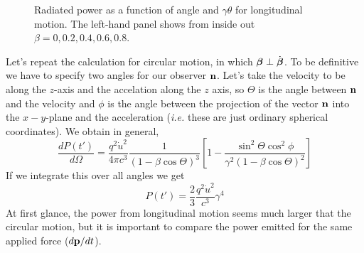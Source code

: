{
\begin{figure}
\centering
\caption{Radiated power as a function of angle and $\gamma \theta$ for
  longitudinal motion. The left-hand panel shows from inside out
  $\beta=0,0.2,0.4,0.6,0.8$.}
\end{figure}
}

Let's repeat the calculation for circular motion, in which $\mbox{\boldmath $\beta$}
\perp {\dot{\mbox{\boldmath $\beta$}}}$.  To be definitive we have to specify two
angles for our observer ${\bf n}$.  Let's take the velocity to be
along the $z$-axis and the accelation along the $z$ axis, so $\Theta$
is the angle between ${\bf n}$ and the velocity and $\phi$ is the
angle between the projection of the vector ${\bf n}$ into the $x-y$-plane 
and the acceleration ({\em i.e.} these are just ordinary spherical coordinates). We obtain in general,
\begin{equation}
\frac{dP(t')}{d\Omega} = \frac{q^2 {\dot u}^2}{4\pi c^3} 
\frac{ 1 }{\left ( 1 - \beta \cos\Theta  \right )^3}
\left [ 1 - 
\frac{ \sin^2 \Theta \cos^2\phi }{\gamma^2 \left ( 1 - \beta \cos\Theta  \right )^2} \right ]
\label{eq:219}
\end{equation}
If we integrate this over all angles we get
\begin{equation}
P(t') = \frac{2}{3} \frac{q^2 {\dot u}^2}{c^3} \gamma^4
\label{eq:220}
\end{equation}
At first glance, the power from longitudinal motion seems much larger that the circular 
motion, but it is important to compare the power emitted for the same applied force ($d{\bf p}/dt$).

